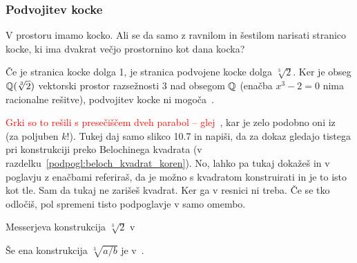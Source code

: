\subsubsection{Podvojitev kocke}
\label{podpogl:podvojitev_kocke}


V prostoru imamo kocko. Ali se da samo z ravnilom in šestilom narisati stranico kocke, ki ima dvakrat večjo prostornino kot dana kocka?

Če je stranica kocke dolga 1, je stranica podvojene kocke dolga $\sqrt[3]{2}$. Ker je obseg $\mathbb Q(\sqrt[3]{2})$ vektorski prostor razsežnosti $3$ nad obsegom $\mathbb Q$ (enačba $ x^3 - 2 = 0 $ nima racionalne rešitve), podvojitev kocke ni mogoča~\cite[str. 78]{jerman1998}.

\textcolor{red}{Grki so to rešili s presečiščem dveh parabol -- glej~\cite[str.\ 5--6]{videla1997}}, kar je zelo podobno oni iz~\cite[str.\ 156]{geometricconstructions} (za poljuben $k$!). Tukej daj samo slikco 10.7 in napiši, da za dokaz gledajo tistega pri konstrukciji preko Belochinega kvadrata (v razdelku~\ref{podpogl:beloch_kvadrat_koren}). No, lahko pa tukaj dokažeš in v poglavju z enačbami referiraš, da je možno s kvadratom konstruirati in je to isto kot tle. Sam da tukaj ne zarišeš kvadrat. Ker ga v resnici ni treba. Če se tko odločiš, pol spremeni tisto podpoglavje v samo omembo.

Messerjeva konstrukcija $\sqrt[3]{2}$ v~\cite[str.\ 46]{land2013}

Še ena konstrukcija $\sqrt[3]{a/b}$ je v~\cite[str.\ 366--367]{geret1995}.

